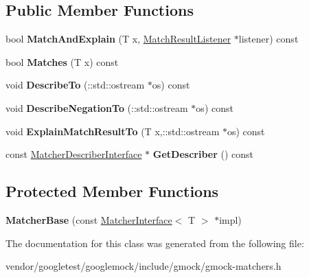 \subsection*{Public Member Functions}
\begin{DoxyCompactItemize}
\item 
bool {\bfseries Match\+And\+Explain} (T x, \hyperlink{classtesting_1_1MatchResultListener}{Match\+Result\+Listener} $\ast$listener) const \hypertarget{classtesting_1_1internal_1_1MatcherBase_ae3f5f3150a95cafb1c2ab7c864a42e65}{}\label{classtesting_1_1internal_1_1MatcherBase_ae3f5f3150a95cafb1c2ab7c864a42e65}

\item 
bool {\bfseries Matches} (T x) const \hypertarget{classtesting_1_1internal_1_1MatcherBase_a105a9dae7afecee8898db8ad1887b0db}{}\label{classtesting_1_1internal_1_1MatcherBase_a105a9dae7afecee8898db8ad1887b0db}

\item 
void {\bfseries Describe\+To} (\+::std\+::ostream $\ast$os) const \hypertarget{classtesting_1_1internal_1_1MatcherBase_afcb24e7d1ff27e147e0e607d2a122467}{}\label{classtesting_1_1internal_1_1MatcherBase_afcb24e7d1ff27e147e0e607d2a122467}

\item 
void {\bfseries Describe\+Negation\+To} (\+::std\+::ostream $\ast$os) const \hypertarget{classtesting_1_1internal_1_1MatcherBase_a47cc840bc783fc0ceafbfb68d0ea5758}{}\label{classtesting_1_1internal_1_1MatcherBase_a47cc840bc783fc0ceafbfb68d0ea5758}

\item 
void {\bfseries Explain\+Match\+Result\+To} (T x,\+::std\+::ostream $\ast$os) const \hypertarget{classtesting_1_1internal_1_1MatcherBase_a3a4c25a6e6c658b1fd52fd42c2fbd690}{}\label{classtesting_1_1internal_1_1MatcherBase_a3a4c25a6e6c658b1fd52fd42c2fbd690}

\item 
const \hyperlink{classtesting_1_1MatcherDescriberInterface}{Matcher\+Describer\+Interface} $\ast$ {\bfseries Get\+Describer} () const \hypertarget{classtesting_1_1internal_1_1MatcherBase_a716ce3d9f89cb63f9911d56f307b6ff6}{}\label{classtesting_1_1internal_1_1MatcherBase_a716ce3d9f89cb63f9911d56f307b6ff6}

\end{DoxyCompactItemize}
\subsection*{Protected Member Functions}
\begin{DoxyCompactItemize}
\item 
{\bfseries Matcher\+Base} (const \hyperlink{classtesting_1_1MatcherInterface}{Matcher\+Interface}$<$ T $>$ $\ast$impl)\hypertarget{classtesting_1_1internal_1_1MatcherBase_aed3e080f12ea7bde535ddf02b6f66922}{}\label{classtesting_1_1internal_1_1MatcherBase_aed3e080f12ea7bde535ddf02b6f66922}

\end{DoxyCompactItemize}


The documentation for this class was generated from the following file\+:\begin{DoxyCompactItemize}
\item 
vendor/googletest/googlemock/include/gmock/gmock-\/matchers.\+h\end{DoxyCompactItemize}
